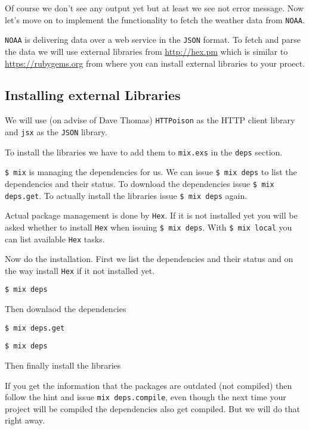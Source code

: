 \documentclass[10pt, a4paper]{article}
\newcommand{\includecode}[3]{}
\begin{document}
Of course we don't see any output yet but at least we see not error message. 
Now let's move on to implement the functionality to fetch the weather data
from \texttt{NOAA}.

\texttt{NOAA} is delivering data over a web service in the \texttt{JSON} 
format. To fetch and parse the data we will use external libraries from 
\url{http://hex.pm} which is similar to \url{https://rubygems.org} from where 
you can install external libraries to your proect.

\subsection{Installing external Libraries}
We will use (on advise of Dave Thomas) \texttt{HTTPoison} as the HTTP client
library and \texttt{jsx} as the \texttt{JSON} library.

To install the libraries we have to add them to \texttt{mix.exs} in the 
\texttt{deps} section.

\includecode{mix.exs}{lst:mixexs}{listings/mix.exs}

\texttt{\$ mix} is managing the dependencies for us. We can issue 
\texttt{\$ mix deps} to list the dependencies and their status. To download the
dependencies issue \texttt{\$ mix deps.get}. To actually install the
libraries issue \texttt{\$ mix deps} again.

Actual package management is done by \texttt{Hex}. If it is not installed 
yet you will be asked whether to install \texttt{Hex} when issuing 
\texttt{\$ mix deps}. With \texttt{\$ mix local} you can list available 
\texttt{Hex} tasks.

Now do the installation. First we list the dependencies and their status and on
the way install \texttt{Hex} if it not installed yet.

\texttt{\$ mix deps}

\includecode{mix deps}{lst:mixdeps}{listings/mix-deps}

Then downlaod the dependencies

\texttt{\$ mix deps.get}

\includecode{mix deps.get}{list:mixdepsget}{listings/mix-deps-get}

\texttt{\$ mix deps}

Then finally install the libraries
\includecode{mix deps}{lst:mixdeps2}{listings/mix-deps2}

If you get the information that the packages are outdated (not compiled) then 
follow the hint and issue \texttt{mix deps.compile}, even though the next time
your project will be compiled the dependencies also get compiled. But we will 
do that right away.
\end{document}
